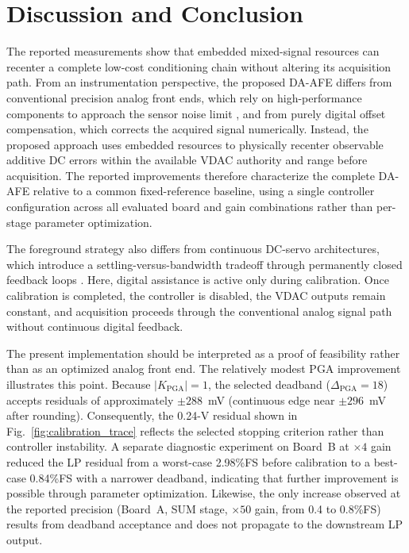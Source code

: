 \section{Discussion and Conclusion}

The reported measurements show that embedded mixed-signal resources can recenter a complete low-cost conditioning chain without altering its acquisition path. From an instrumentation perspective, the proposed DA-AFE differs from conventional precision analog front ends, which rely on high-performance components to approach the sensor noise limit \cite{Kirchhoff2017}, and from purely digital offset compensation, which corrects the acquired signal numerically. Instead, the proposed approach uses embedded resources to physically recenter observable additive DC errors within the available VDAC authority and range before acquisition. The reported improvements therefore characterize the complete DA-AFE relative to a common fixed-reference baseline, using a single controller configuration across all evaluated board and gain combinations rather than per-stage parameter optimization.

The foreground strategy also differs from continuous DC-servo architectures, which introduce a settling-versus-bandwidth tradeoff through permanently closed feedback loops \cite{Liu2020,Antoniadis2025}. Here, digital assistance is active only during calibration. Once calibration is completed, the controller is disabled, the VDAC outputs remain constant, and acquisition proceeds through the conventional analog signal path without continuous digital feedback.

\label{sec:pga-note}
The present implementation should be interpreted as a proof of feasibility rather than as an optimized analog front end. The relatively modest PGA improvement illustrates this point. Because $|K_{\mathrm{PGA}}|=1$, the selected deadband ($\Delta_{\mathrm{PGA}}=18$) accepts residuals of approximately $\pm288$~mV (continuous edge near $\pm296$~mV after rounding). Consequently, the 0.24-V residual shown in Fig.~\ref{fig:calibration_trace} reflects the selected stopping criterion rather than controller instability. A separate diagnostic experiment on Board~B at $\times4$ gain reduced the LP residual from a worst-case 2.98\%FS before calibration to a best-case 0.84\%FS with a narrower deadband, indicating that further improvement is possible through parameter optimization. Likewise, the only increase observed at the reported precision (Board~A, SUM stage, $\times50$ gain, from 0.4 to 0.8\%FS) results from deadband acceptance and does not propagate to the downstream LP output.

